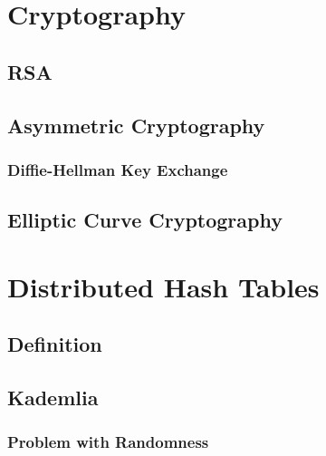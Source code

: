 \chapter{Cryptography}
\label{Cryptography}

\section{RSA}

\section{Asymmetric Cryptography}
\subsection{Diffie-Hellman Key Exchange}

\section{Elliptic Curve Cryptography}

\chapter{Distributed Hash Tables}
\label{DHT}

\section{Definition}

\section{Kademlia}
\subsection{Problem with Randomness}

